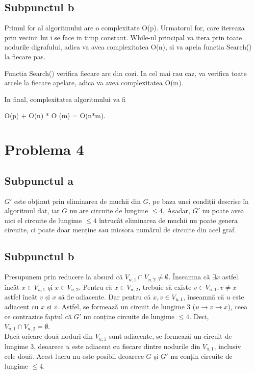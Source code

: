 \documentclass{article}
\begin{document}
\subsection*{\fontsize{16}{30}\selectfont Subpunctul b}
{\fontsize{14}{16}\selectfont
Primul for al algoritmului are o complexitate O(p). Urmatorul for, care itereaza prin vecinii lui i se face in timp constant. While-ul principal va itera prin toate nodurile digrafului, adica va avea complexitatea O(n), si va apela functia Search() la fiecare pas.

Functia Search() verifica fiecare arc din cozi. In cel mai rau caz, va verifica toate arcele la fiecare apelare, adica va avea complexitatea O(m).

In final, complexitatea algoritmului va fi  \\ \centerline {O(p) + O(n) * O (m) = O(n*m).}
}

\section*{\fontsize{20}{50}\selectfont Problema 4}

\subsection*{\fontsize{16}{30}\selectfont Subpunctul a}
{\fontsize{14}{16}\selectfont
$G'$ este obținut prin eliminarea de muchii din $G$, pe baza unei condiții descrise în algoritmul dat, iar $G$ nu are circuite de lungime $\le 4$. Așadar, $G'$ nu poate avea nici el circuite de lungime $\le 4$ întrucât eliminarea de muchii nu poate genera circuite, ci poate doar menține sau micșora numărul de circuite din acel graf.}

\subsection*{\fontsize{16}{30}\selectfont Subpunctul b}
{\fontsize{14}{16}\selectfont
Presupunem prin reducere la absurd că $V_{u,1} \cap V_{u,2} \neq \emptyset$. Înseamna că $\exists x$ astfel încât $x \in V_{u,1}$ și $x \in V_{u,2}$. Pentru că $x \in V_{u,2}$, trebuie să existe $v \in V_{u,1}, v \ne x$ astfel încât $v$ și $x$ să fie adiacente. Dar pentru că $x,v \in V_{u,1}$, înseamnă că $u$ este adiacent cu $x$ și $v$. Astfel, se formează un circuit de lungime 3 ($u \rightarrow v \rightarrow x$), ceea ce contrazice faptul că $G'$ nu conține circuite de lungime $\le 4$. Deci, $V_{u,1} \cap V_{u,2} = \emptyset$.}
\\
{\fontsize{14}{16}\selectfont
Dacă oricare două noduri din $V_{u,1}$ sunt adiacente, se formează un circuit de lungime 3, deoarece $u$ este adiacent cu fiecare dintre nodurile din $V_{u,1}$, inclusiv cele două. Acest lucru nu este posibil deoarece $G$ și $G'$ nu conțin circuite de lungime $\le 4$.}
\end{document}
